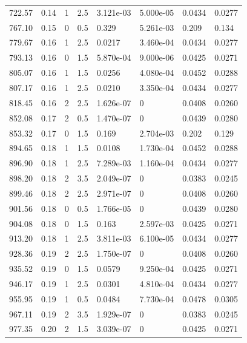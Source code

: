 \documentclass[preview]{standalone}
\begin{document}
{{{\begin{tabular}{L{1.2cm}C{1.2cm} C{0.3cm}C{0.5cm} C{1.4cm}C{1.4cm} C{1.4cm}C{1.4cm}}
  722.57  &  0.14  & 1     & 2.5 &  3.121e-03  & 5.000e-05  & 0.0434 &  0.0277   \\ 
  767.10  &  0.15  & 0     & 0.5 &  0.329  & 5.261e-03  & 0.209 &  0.134   \\ 
  779.67  &  0.16  & 1     & 2.5 &  0.0217  & 3.460e-04  & 0.0434 &  0.0277   \\ 
  793.13  &  0.16  & 0     & 1.5 &  5.870e-04  & 9.000e-06  & 0.0425 &  0.0271   \\ 
  805.07  &  0.16  & 1     & 1.5 &  0.0256  & 4.080e-04  & 0.0452 &  0.0288   \\ 
  807.17  &  0.16  & 1     & 2.5 &  0.0210  & 3.350e-04  & 0.0434 &  0.0277   \\ 
  818.45  &  0.16  & 2     & 2.5 &  1.626e-07  & 0  & 0.0408 &  0.0260   \\ 
  852.08  &  0.17  & 2     & 0.5 &  1.470e-07  & 0  & 0.0439 &  0.0280   \\ 
  853.32  &  0.17  & 0     & 1.5 &  0.169  & 2.704e-03  & 0.202 &  0.129   \\ 
  894.65  &  0.18  & 1     & 1.5 &  0.0108  & 1.730e-04  & 0.0452 &  0.0288   \\ 
  896.90  &  0.18  & 1     & 2.5 &  7.289e-03  & 1.160e-04  & 0.0434 &  0.0277   \\ 
  898.20  &  0.18  & 2     & 3.5 &  2.049e-07  & 0  & 0.0383 &  0.0245   \\ 
  899.46  &  0.18  & 2     & 2.5 &  2.971e-07  & 0  & 0.0408 &  0.0260   \\ 
  901.56  &  0.18  & 0     & 0.5 &  1.766e-05  & 0  & 0.0439 &  0.0280   \\ 
  904.08  &  0.18  & 0     & 1.5 &  0.163  & 2.597e-03  & 0.0425 &  0.0271   \\ 
  913.20  &  0.18  & 1     & 2.5 &  3.811e-03  & 6.100e-05  & 0.0434 &  0.0277   \\ 
  928.36  &  0.19  & 2     & 2.5 &  1.750e-07  & 0  & 0.0408 &  0.0260   \\ 
  935.52  &  0.19  & 0     & 1.5 &  0.0579  & 9.250e-04  & 0.0425 &  0.0271   \\ 
  946.17  &  0.19  & 1     & 2.5 &  0.0301  & 4.810e-04  & 0.0434 &  0.0277   \\ 
  955.95  &  0.19  & 1     & 0.5 &  0.0484  & 7.730e-04  & 0.0478 &  0.0305   \\ 
  967.11  &  0.19  & 2     & 3.5 &  1.929e-07  & 0  & 0.0383 &  0.0245   \\ 
  977.35  &  0.20  & 2     & 1.5 &  3.039e-07  & 0  & 0.0425 &  0.0271   \\ 

\end{tabular}}}}
\end{document}
